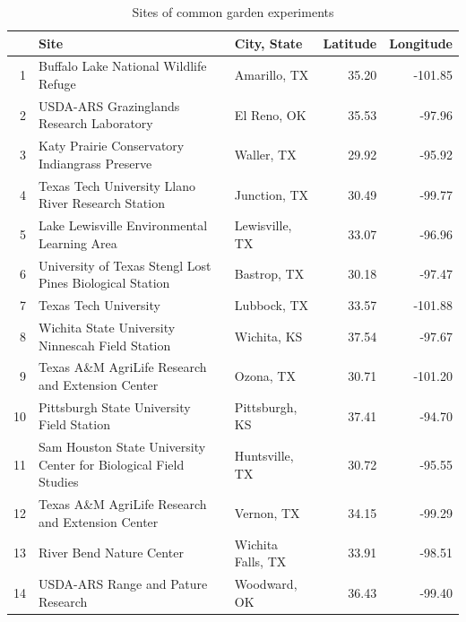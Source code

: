 \documentclass[11pt]{article}
\begin{document}
\clearpage
\begin{table}
	\centering
	\begin{tabular}{rllrr}
		\hline
		& Site & City, State & Latitude & Longitude \\ 
		\hline
		1 & Buffalo Lake National Wildlife Refuge & Amarillo, TX & 35.20 & -101.85 \\ 
		2 & USDA-ARS Grazinglands Research Laboratory & El Reno, OK & 35.53 & -97.96 \\ 
		3 & Katy Prairie Conservatory Indiangrass Preserve & Waller, TX & 29.92 & -95.92 \\ 
		4 & Texas Tech University Llano River Research Station & Junction, TX & 30.49 & -99.77 \\ 
		5 & Lake Lewisville Environmental Learning Area & Lewisville, TX & 33.07 & -96.96 \\ 
		6 & University of Texas Stengl Lost Pines Biological Station & Bastrop, TX & 30.18 & -97.47 \\ 
		7 & Texas Tech University & Lubbock, TX & 33.57 & -101.88 \\ 
		8 & Wichita State University Ninnescah Field Station & Wichita, KS & 37.54 & -97.67 \\ 
		9 & Texas A\&M AgriLife Research and Extension Center & Ozona, TX & 30.71 & -101.20 \\ 
		10 & Pittsburgh State University Field Station & Pittsburgh, KS & 37.41 & -94.70 \\ 
		11 & Sam Houston State University Center for Biological Field Studies & Huntsville, TX & 30.72 & -95.55 \\ 
		12 & Texas A\&M AgriLife Research and Extension Center & Vernon, TX & 34.15 & -99.29 \\ 
		13 & River Bend Nature Center & Wichita Falls, TX & 33.91 & -98.51 \\ 
		14 & USDA-ARS Range and Pature Research & Woodward, OK & 36.43 & -99.40 \\ 
		\hline
	\end{tabular}
	\caption{Sites of common garden experiments} 
	\label{tab:experiment}
\end{table}
\end{document}
